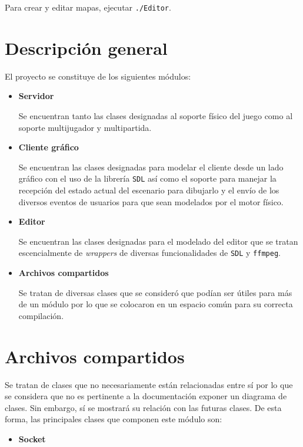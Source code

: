 \documentclass[a4paper]{article}
\begin{document}
Para crear y editar mapas, ejecutar \texttt{./Editor}.

\section{Descripción general}

El proyecto se constituye de los siguientes módulos:

\begin{itemize}
	\item \textbf{Servidor}

Se encuentran tanto las clases designadas al soporte físico del juego como al soporte multijugador y multipartida.

	\item \textbf{Cliente gráfico}
	
Se encuentran las clases designadas para modelar el cliente desde un lado gráfico con el uso de la librería \texttt{SDL} así como el soporte para manejar la recepción del estado actual del escenario para dibujarlo y el envío de los diversos eventos de usuarios para que sean modelados por el motor físico.
	\item \textbf{Editor}
	
Se encuentran las clases designadas para el modelado del editor que se tratan escencialmente de \textit{wrappers} de diversas funcionalidades de \texttt{SDL} y \texttt{ffmpeg}.

	\item \textbf{Archivos compartidos}
	
Se tratan de diversas clases que se consideró que podían ser útiles para más de un módulo por lo que se colocaron en un espacio común para su correcta compilación.
\end{itemize}

\section{Archivos compartidos}

Se tratan de clases que no necesariamente están relacionadas entre sí por lo que se considera que no es pertinente a la documentación exponer un diagrama de clases. Sin embargo, sí se mostrará su relación con las futuras clases. De esta forma, las principales clases que componen este módulo son:

\newpage

\begin{itemize}
	\item \textbf{Socket}
\end{itemize}
\end{document}
